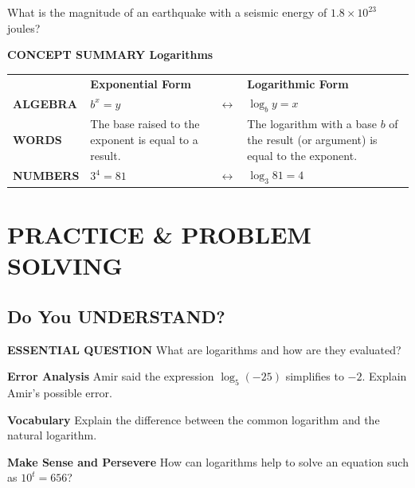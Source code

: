 \documentclass{article}
\newenvironment{concept-summary}{}{}
\newenvironment{tryit}[1]{}{}
\newenvironment{practice}[2]{}{}
\begin{document}
\begin{tryit}{6}
What is the magnitude of an earthquake with a seismic energy of $1.8 \times 10^{23}$ joules?
\end{tryit}

\begin{concept-summary}
\textbf{CONCEPT SUMMARY Logarithms}

\begin{tabular}{p{}p{}cp{}}
& \textbf{Exponential Form} & & \textbf{Logarithmic Form} \\
\textbf{ALGEBRA} & $b^x = y$ & $\leftrightarrow$ & $\log_b y = x$ \\
\textbf{WORDS} & The base raised to the exponent is equal to a result. & & The logarithm with a base $b$ of the result (or argument) is equal to the exponent. \\
\textbf{NUMBERS} & $3^4 = 81$ & $\leftrightarrow$ & $\log_3 81 = 4$ \\
\end{tabular}
\end{concept-summary}

\section*{PRACTICE \& PROBLEM SOLVING}

\subsection*{Do You UNDERSTAND?}

\begin{practice}{1}{?}
\textbf{ESSENTIAL QUESTION} What are logarithms and how are they evaluated?
\end{practice}

\begin{practice}{2}{?}
\textbf{Error Analysis} Amir said the expression $\log_5 (-25)$ simplifies to $-2$. Explain Amir's possible error.
\end{practice}

\begin{practice}{3}{?}
\textbf{Vocabulary} Explain the difference between the common logarithm and the natural logarithm.
\end{practice}

\begin{practice}{4}{?}
\textbf{Make Sense and Persevere} How can logarithms help to solve an equation such as $10^t = 656$?
\end{practice}
\end{document}
